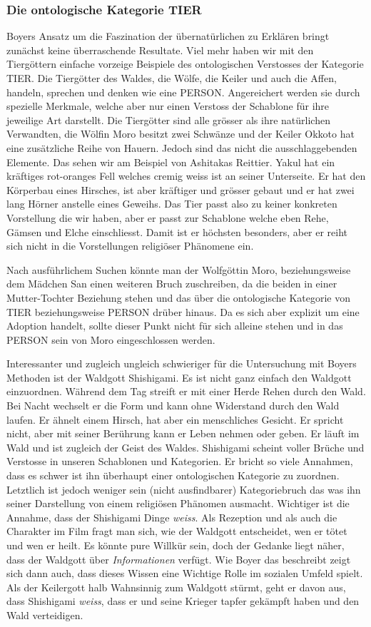 \subsubsection{Die ontologische Kategorie TIER}
Boyers Ansatz um die Faszination der übernatürlichen zu Erklären bringt zunächst keine überraschende Resultate. Viel mehr haben wir mit den Tiergöttern einfache vorzeige Beispiele des ontologischen Verstosses der Kategorie TIER. Die Tiergötter des Waldes, die Wölfe, die Keiler und auch die Affen, handeln, sprechen und denken wie eine PERSON. Angereichert werden sie durch spezielle Merkmale, welche aber nur einen Verstoss der Schablone für ihre jeweilige Art darstellt. Die Tiergötter sind alle grösser als ihre natürlichen Verwandten, die Wölfin Moro besitzt zwei Schwänze und der Keiler Okkoto hat eine zusätzliche Reihe von Hauern. Jedoch sind das nicht die ausschlaggebenden Elemente. Das sehen wir am Beispiel von Ashitakas Reittier. Yakul hat ein kräftiges rot-oranges Fell welches cremig weiss ist an seiner Unterseite. Er hat den Körperbau eines Hirsches, ist aber kräftiger und grösser gebaut und er hat zwei lang Hörner anstelle eines Geweihs. Das Tier passt also zu keiner konkreten Vorstellung die wir haben, aber er passt zur Schablone welche eben Rehe, Gämsen und Elche einschliesst. Damit ist er höchsten besonders, aber er reiht sich nicht in die Vorstellungen religiöser Phänomene ein.

Nach ausführlichem Suchen könnte man der Wolfgöttin Moro, beziehungsweise dem Mädchen San einen weiteren Bruch zuschreiben, da die beiden in einer Mutter-Tochter Beziehung stehen und das über die ontologische Kategorie von TIER beziehungsweise PERSON drüber hinaus. Da es sich aber explizit um eine Adoption handelt, sollte dieser Punkt nicht für sich alleine stehen und in das PERSON sein von Moro eingeschlossen werden.

Interessanter und zugleich ungleich schwieriger für die Untersuchung mit Boyers Methoden ist der Waldgott Shishigami. Es ist nicht ganz einfach den Waldgott einzuordnen. Während dem Tag streift er mit einer Herde Rehen durch den Wald. Bei Nacht wechselt er die Form und kann ohne Widerstand durch den Wald laufen. Er ähnelt einem Hirsch, hat aber ein menschliches Gesicht. Er spricht nicht, aber mit seiner Berührung kann er Leben nehmen oder geben. Er läuft im Wald und ist zugleich der Geist des Waldes. Shishigami scheint voller Brüche und Verstosse in unseren Schablonen und Kategorien. Er bricht so viele Annahmen, dass es schwer ist ihn überhaupt einer ontologischen Kategorie zu zuordnen. Letztlich ist jedoch weniger sein (nicht ausfindbarer) Kategoriebruch das was ihn seiner Darstellung von einem religiösen Phänomen ausmacht. Wichtiger ist die Annahme, dass der Shishigami Dinge \emph{weiss}. Als Rezeption und als auch die Charakter im Film fragt man sich, wie der Waldgott entscheidet, wen er tötet und wen er heilt. Es könnte pure Willkür sein, doch der Gedanke liegt näher, dass der Waldgott über \emph{Informationen} verfügt. Wie Boyer das beschreibt zeigt sich dann auch, dass dieses Wissen eine Wichtige Rolle im sozialen Umfeld spielt. Als der Keilergott halb Wahnsinnig zum Waldgott stürmt, geht er davon aus, dass Shishigami \emph{weiss}, dass er und seine Krieger tapfer gekämpft haben und den Wald verteidigen.

